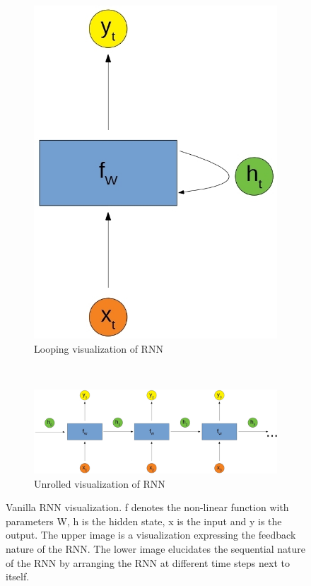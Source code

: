 \documentclass{article}
\begin{document}
\begin{figure}[H]
    \centering
    \begin{subfigure}{1\textwidth}
        \centering
        \includegraphics[scale=0.2]{rsz_rnn_roll}
        \caption{Looping visualization of RNN}
    \end{subfigure}\\
    \begin{subfigure}{1\textwidth}
        \centering
        \includegraphics[scale=0.2]{rsz_rnn_unroll2}
        \caption{Unrolled visualization of RNN}
    \end{subfigure}
    \caption{Vanilla RNN visualization. f denotes the non-linear function with parameters W, h is the hidden state, x is the input and y is the output. The upper image is a visualization expressing the feedback nature of the RNN. The lower image elucidates the sequential nature of the RNN by arranging the RNN at different time steps next to itself.}
\end{figure}
\end{document}

